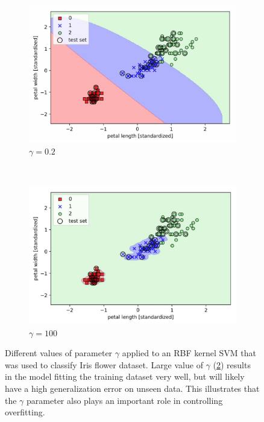 \documentclass[11pt]{article}
\begin{document}
    \begin{figure}[hbt!]
        \centering
        \begin{subfigure}[t]{.48\textwidth}
            \centering
            \includegraphics[width=\columnwidth]{img/iris_svm_gamma_02.png}
            \caption{$\gamma=0.2$}
            \label{fig:iris_svm_gamma_0.2}
        \end{subfigure}
        ~ %
        \begin{subfigure}[t]{.48\textwidth}
            \centering
            \includegraphics[width=\columnwidth]{img/iris_svm_gamma_100.png}
            \caption{$\gamma=100$}
            \label{fig:iris_svm_gamma_100}
        \end{subfigure}
        \caption{Different values of parameter $\gamma$ applied to an RBF kernel SVM that was used to classify Iris flower dataset.
        Large value of $\gamma$ (\ref{fig:iris_svm_gamma_100}) results in the model fitting the training dataset very well, but will likely have a high generalization error on unseen data.
        This illustrates that the $\gamma$ parameter also plays an important role in controlling overfitting.}
        \label{fig:iris_svm_rbf}
    \end{figure}
\end{document}
